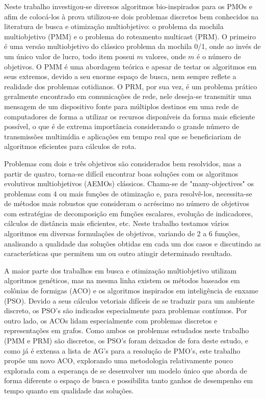 Neste trabalho investigou-se diversos algoritmos bio-inspirados para os PMOs e afim de colocá-los à prova utilizou-se dois problemas discretos bem conhecidos na literatura de busca e otimização multiobjetivo: o problema da mochila multiobjetivo (PMM) e o problema do roteamento multicast (PRM). O primeiro é uma versão multiobjetivo do clássico problema da mochila 0/1, onde ao invés de um único valor de lucro, todo item possui $m$ valores, onde $m$ é o número de objetivos. O PMM é uma abordagem teórica e apesar de testar os algoritmos em seus extremos, devido a seu enorme espaço de busca, nem sempre reflete a realidade dos problemas cotidianos. O PRM, por sua vez, é um problema prático geralmente encontrado em comunicações de rede, nele deseja-se transmitir uma mensagem de um dispositivo fonte para múltiplos destinos em uma rede de computadores de forma a utilizar os recursos disponíveis da forma mais eficiente possível, o que é de extrema importância considerando o grande número de transmissões multimídia e aplicações em tempo real que se beneficiariam de algoritmos eficientes para cálculos de rota.

Problemas com dois e três objetivos são considerados bem resolvidos, mas a partir de quatro, torna-se difícil encontrar boas soluções com os algoritmos evolutivos multiobjetivos (AEMOs) clássicos. Chama-se de "many-objectives" os problemas com 4 ou mais funções de otimização e, para resolvê-los, necessita-se de métodos mais robustos que consideram o acréscimo no número de objetivos com estratégias de decomposição em funções escalares, evolução de indicadores, cálculos de distância mais eficientes, etc. Neste trabalho testamos vários algoritmos em diversas formulações de objetivos, variando de 2 a 6 funções, analisando a qualidade das soluções obtidas em cada um dos casos e discutindo as características que permitem um ou outro atingir determinado resultado.

A maior parte dos trabalhos em busca e otimização multiobjetivo utilizam algoritmos genéticos, mas na mesma linha existem os métodos baseados em colônias de formigas (ACO) e os algoritmos inspirados em inteligência de enxame (PSO). Devido a seus cálculos vetoriais difíceis de se traduzir para um ambiente discreto, os PSO's são indicados especialmente para problemas contínuos. Por outro lado, os ACOs lidam especialmente com problemas discretos e representações em grafos. Como ambos os problemas estudados neste trabalho (PMM e PRM) são discretos, os PSO's foram deixados de fora deste estudo, e como já é extensa a lista de AG's para a resolução de PMO's, este trabalho propõe um novo ACO, explorando uma metodologia relativamente pouco explorada com a esperança de se desenvolver um modelo único que aborda de forma diferente o espaço de busca e possibilita tanto ganhos de desempenho em tempo quanto em qualidade das soluções.

